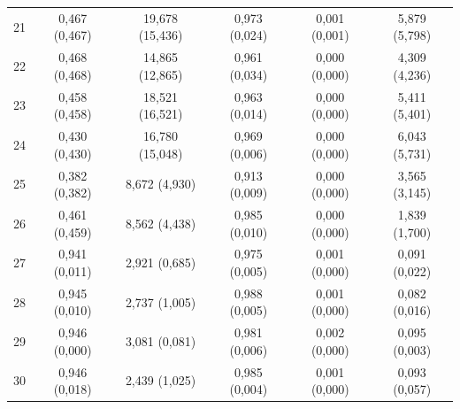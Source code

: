 \begin{tabular}{l c c c c c}
21 & 0,467 (0,467) & 19,678 (15,436) & 0,973 (0,024) & 0,001 (0,001) & 5,879 (5,798) \\
22 & 0,468 (0,468) & 14,865 (12,865) & 0,961 (0,034) & 0,000 (0,000) & 4,309 (4,236) \\
23 & 0,458 (0,458) & 18,521 (16,521) & 0,963 (0,014) & 0,000 (0,000) & 5,411 (5,401) \\
24 & 0,430 (0,430) & 16,780 (15,048) & 0,969 (0,006) & 0,000 (0,000) & 6,043 (5,731) \\
25 & 0,382 (0,382) & 8,672 (4,930) & 0,913 (0,009) & 0,000 (0,000) & 3,565 (3,145) \\
26 & 0,461 (0,459) & 8,562 (4,438) & 0,985 (0,010) & 0,000 (0,000) & 1,839 (1,700) \\
27 & 0,941 (0,011) & 2,921 (0,685) & 0,975 (0,005) & 0,001 (0,000) & 0,091 (0,022) \\
28 & 0,945 (0,010) & 2,737 (1,005) & 0,988 (0,005) & 0,001 (0,000) & 0,082 (0,016) \\
29 & 0,946 (0,000) & 3,081 (0,081) & 0,981 (0,006) & 0,002 (0,000) & 0,095 (0,003) \\
30 & 0,946 (0,018) & 2,439 (1,025) & 0,985 (0,004) & 0,001 (0,000) & 0,093 (0,057) \\
\hline 
 \end{tabular}

